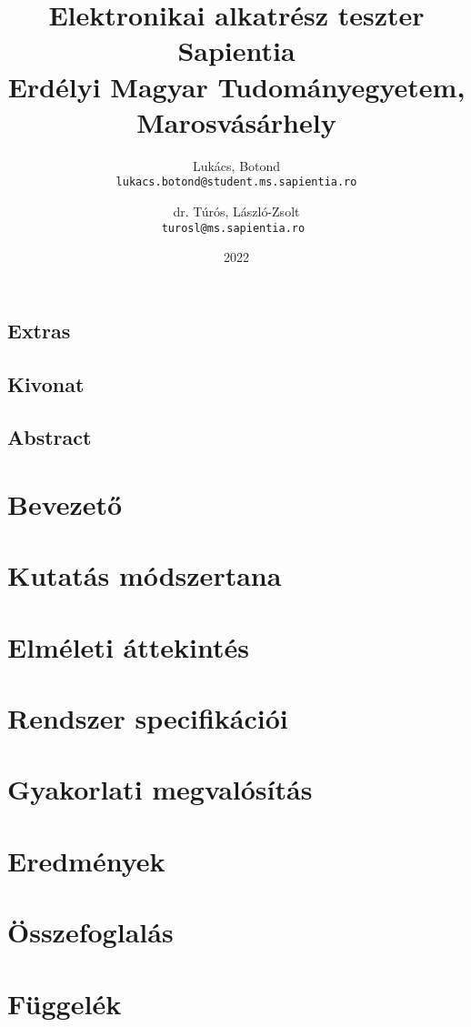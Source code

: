 \documentclass[12pt, twosides]{report}
\title{
	{Elektronikai alkatrész teszter}\\
	{\large Sapientia\\
	Erdélyi Magyar Tudományegyetem, Marosvásárhely}
}
\author{
	Lukács, Botond\\
	\texttt{lukacs.botond@student.ms.sapientia.ro}
	\and
	dr. Túrós, László-Zsolt\\
	\texttt{turosl@ms.sapientia.ro }	
}
\date{2022}
\begin{document}


\section*{Extras}

\pagebreak



\section*{Kivonat}

\pagebreak

\section*{Abstract}

\pagebreak


\tableofcontents

\listoffigures

\chapter{Bevezető}


\chapter{Kutatás módszertana}


\chapter{Elméleti áttekintés}


\chapter{Rendszer specifikációi}


\chapter{Gyakorlati megvalósítás} \label{chpt:implementation}


\chapter{Eredmények}


\chapter{Összefoglalás}






\appendix
\chapter{Függelék}

\end{document}

